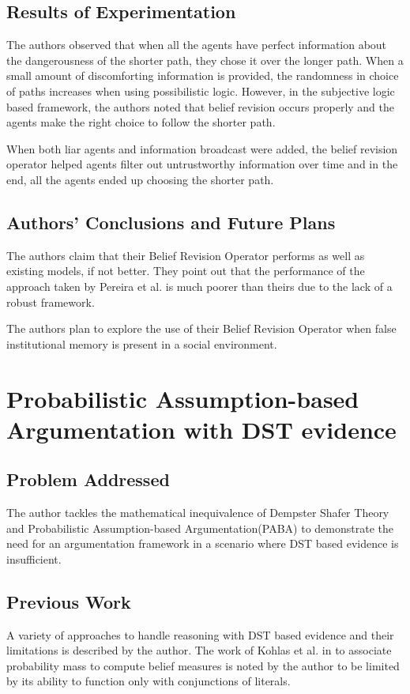\documentclass[UTF8]{article}
\begin{document}
\subsection{Results of Experimentation}
The authors observed that when all the agents have perfect information about the dangerousness of the shorter path, 
they chose it over the longer path. When a small amount of discomforting information is provided, the randomness in choice
of paths increases when using possibilistic logic. However, in the subjective logic based framework, the authors noted that 
belief revision occurs properly and the agents make the right choice to follow the shorter path. 

When both liar agents and information broadcast were added, the belief revision operator helped 
agents filter out untrustworthy information over time and in the end, all the agents ended up choosing the shorter path.

\subsection{Authors' Conclusions and Future Plans}
The authors claim that their Belief Revision Operator performs as well as existing models, if not better.
They point out that the performance of the approach taken by Pereira et al. is much poorer than theirs due to the lack of a robust framework.

The authors plan to explore the use of their Belief Revision Operator when false institutional memory is present in a social environment.  


\section{Probabilistic Assumption-based Argumentation with DST evidence}
\subsection{Problem Addressed}
The author tackles the mathematical inequivalence of Dempster Shafer Theory and Probabilistic Assumption-based Argumentation(PABA) to demonstrate the need for an argumentation framework in a scenario 
where DST based evidence is insufficient.

\subsection{Previous Work}
A variety of approaches to handle reasoning with DST based evidence and their limitations is described by the author. The work of Kohlas et al. in \cite{Kohlas2002} to associate probability 
mass to compute belief measures is noted by the author to be limited by its ability to function only with conjunctions of literals.  
\end{document}
